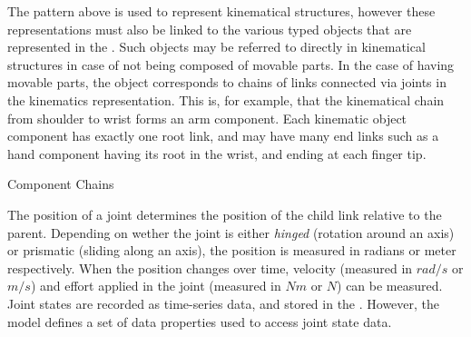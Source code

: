 The pattern above is used to represent kinematical structures, however these representations must also be linked to the various typed objects that are represented in the \neembak.
Such objects may be referred to directly in kinematical structures in case of not being composed of movable parts.
In the case of having movable parts, the object corresponds to chains of links connected via joints in the kinematics representation.
This is, for example, that the kinematical chain from shoulder to wrist forms an arm component.
Each kinematic object component has exactly one root link, and may have many end links such as a hand component having its root in the wrist, and ending at each finger tip.

\begin{ODP}{Component Chains}
\end{ODP}

The position of a joint determines the position of the child link relative to the parent.
Depending on wether the joint is either \emph{hinged} (rotation around an axis) or prismatic (sliding along an axis), the position is measured in radians or meter respectively.
When the position changes over time, velocity (measured in $rad/s$ or $m/s$) and effort applied in the joint (measured in $Nm$ or $N$) can be measured.
Joint states are recorded as time-series data, and stored in the \neemexp. 
However, the \neem model defines a set of data properties used to access joint state data.

